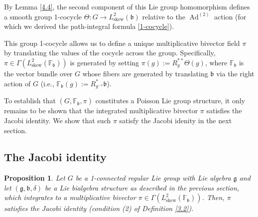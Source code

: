 \documentclass[11pt,reqno]{amsart}
\newtheorem{proposition}[theorem]{Proposition}
\theoremstyle{definition}
\numberwithin{equation}{section}
\begin{document}
By Lemma \ref{4.4}, the second component of this Lie group homomorphism defines a smooth group 1-cocycle $\Theta: G \to L^2_{\text{skew}}(\mathfrak{b})$ relative to the $\operatorname{Ad}^{(2)}$ action (for which we derived the path-integral formula \eqref{1-cocycle}). 

This group 1-cocycle allows us to define a unique multiplicative bivector field $\pi$ by translating the values of the cocycle across the group. Specifically, $\pi \in \Gamma(L^2_{\text{skew}}(\mathbb{F}_{\mathfrak{b}}))$ is generated by setting $\pi(g) := R_{g}^{**}\Theta(g)$, where $\mathbb{F}_{\mathfrak{b}}$ is the vector bundle over $G$ whose fibers are generated by translating $\mathfrak{b}$ via the right action of $G$ (i.e., $\mathbb{F}_{\mathfrak{b}}(g) := R_{g^{-1}}^*\mathfrak{b}$). 

To establish that $(G, \mathbb{F}_{\mathfrak{b}}, \pi)$ constitutes a Poisson Lie group structure, it only remains to be shown that the integrated multiplicative bivector $\pi$ satisfies the Jacobi identity. We show that such $\pi$ satisfy the Jacobi idenity in the next section.

\subsection{The Jacobi identity}

\begin{proposition}
Let $G$ be a 1-connected regular Lie group with Lie algebra $\mathfrak{g}$ and let $(\mathfrak{g}, \mathfrak{b},\delta)$ be a Lie bialgebra structure as described in the previous section, which integrates to a multiplicative bivector $\pi \in \Gamma(L^2_{\text{skew}}(\mathbb{F}_{\mathfrak{b}}))$. Then, $\pi$ satisfies the Jacobi identity (condition (2) of Definition \ref{3.2}).
\end{proposition}
\end{document}

